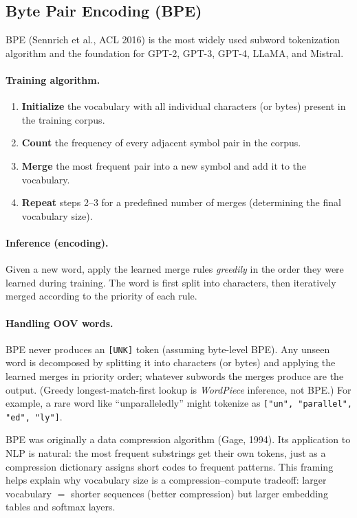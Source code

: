 \subsection{Byte Pair Encoding (BPE)}
\label{sec:bpe}

BPE (Sennrich et al., ACL 2016) is the most widely used subword tokenization algorithm
and the foundation for GPT-2, GPT-3, GPT-4, LLaMA, and Mistral.

\paragraph{Training algorithm.}
\begin{enumerate}
    \item \textbf{Initialize} the vocabulary with all individual characters (or bytes)
          present in the training corpus.
    \item \textbf{Count} the frequency of every adjacent symbol pair in the corpus.
    \item \textbf{Merge} the most frequent pair into a new symbol and add it to the
          vocabulary.
    \item \textbf{Repeat} steps 2--3 for a predefined number of merges (determining
          the final vocabulary size).
\end{enumerate}

\paragraph{Inference (encoding).}
Given a new word, apply the learned merge rules \emph{greedily} in the order they were
learned during training.  The word is first split into characters, then iteratively
merged according to the priority of each rule.

\paragraph{Handling OOV words.}
BPE never produces an \texttt{[UNK]} token (assuming byte-level BPE).  Any unseen word
is decomposed by splitting it into characters (or bytes) and applying the learned merges
in priority order; whatever subwords the merges produce are the output.  (Greedy
longest-match-first lookup is \emph{WordPiece} inference, not BPE.)  For example, a rare
word like ``unparalleledly'' might tokenize as \texttt{["un", "parallel", "ed", "ly"]}.

\begin{keyinsight}
BPE was originally a data compression algorithm (Gage, 1994).  Its application to NLP is
natural: the most frequent substrings get their own tokens, just as a compression
dictionary assigns short codes to frequent patterns.  This framing helps explain why
vocabulary size is a compression--compute tradeoff: larger vocabulary $=$ shorter
sequences (better compression) but larger embedding tables and softmax layers.
\end{keyinsight}


